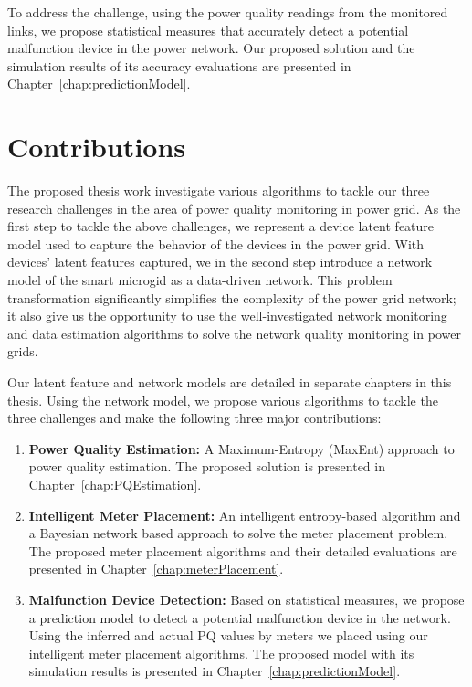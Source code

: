 To address the challenge, using the power quality readings from the monitored links, we propose statistical measures that accurately detect a potential malfunction device in the power network. Our proposed solution and the simulation results of its accuracy evaluations are presented in Chapter~\ref{chap:predictionModel}.

\section{Contributions}
The proposed thesis work investigate various algorithms to tackle our three research challenges in the area of power quality monitoring in power grid. As the first step to tackle the above challenges, we represent a device latent feature model used to capture the behavior of the devices in the power grid. With devices' latent features captured, we in the second step introduce a network model of the smart microgid as a data-driven network. This problem transformation significantly simplifies the complexity of the power grid network; it also give us the opportunity to use the well-investigated network monitoring and data estimation algorithms to solve the network quality monitoring in power grids.

Our latent feature and network models are detailed in separate chapters in this thesis. Using the network model, we propose various algorithms to tackle the three challenges and make the following three major contributions:

\begin{enumerate}
\item \textbf{Power Quality Estimation:} A Maximum-Entropy (MaxEnt) approach to power quality estimation. The proposed solution is presented in Chapter~\ref{chap:PQEstimation}.
\item \textbf{Intelligent Meter Placement:} An intelligent entropy-based algorithm and a Bayesian network based approach to solve the meter placement problem. The proposed meter placement algorithms and their detailed evaluations are presented in Chapter~\ref{chap:meterPlacement}.
\item \textbf{Malfunction Device Detection:} Based on statistical measures, we propose a prediction model to detect a potential malfunction device in the network. Using the inferred and actual PQ values by meters we placed using our intelligent meter placement algorithms. The proposed model with its simulation results is presented in Chapter~\ref{chap:predictionModel}.
\end{enumerate}

